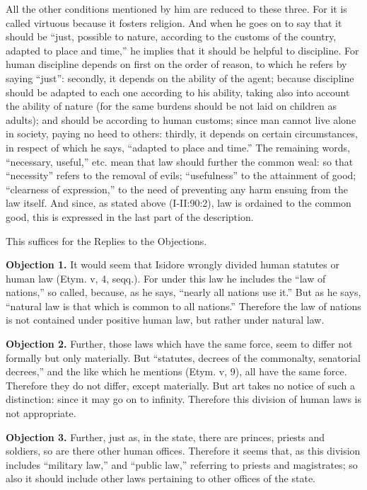 All the other conditions mentioned by him are reduced to these three. For it is called virtuous because it fosters religion. And when he goes on to say that it should be ``just, possible to nature, according to the customs of the country, adapted to place and time,'' he implies that it should be helpful to discipline. For human discipline depends on first on the order of reason, to which he refers by saying ``just'': secondly, it depends on the ability of the agent; because discipline should be adapted to each one according to his ability, taking also into account the ability of nature (for the same burdens should be not laid on children as adults); and should be according to human customs; since man cannot live alone in society, paying no heed to others: thirdly, it depends on certain circumstances, in respect of which he says, ``adapted to place and time.'' The remaining words, ``necessary, useful,'' etc. mean that law should further the common weal: so that ``necessity'' refers to the removal of evils; ``usefulness'' to the attainment of good; ``clearness of expression,'' to the need of preventing any harm ensuing from the law itself. And since, as stated above (I-II:90:2), law is ordained to the common good, this is expressed in the last part of the description.

This suffices for the Replies to the Objections.


\textbf{Objection 1.} It would seem that Isidore wrongly divided human statutes or human law (Etym. v, 4, seqq.). For under this law he includes the ``law of nations,'' so called, because, as he says, ``nearly all nations use it.'' But as he says, ``natural law is that which is common to all nations.'' Therefore the law of nations is not contained under positive human law, but rather under natural law.

\textbf{Objection 2.} Further, those laws which have the same force, seem to differ not formally but only materially. But ``statutes, decrees of the commonalty, senatorial decrees,'' and the like which he mentions (Etym. v, 9), all have the same force. Therefore they do not differ, except materially. But art takes no notice of such a distinction: since it may go on to infinity. Therefore this division of human laws is not appropriate.

\textbf{Objection 3.} Further, just as, in the state, there are princes, priests and soldiers, so are there other human offices. Therefore it seems that, as this division includes ``military law,'' and ``public law,'' referring to priests and magistrates; so also it should include other laws pertaining to other offices of the state.

